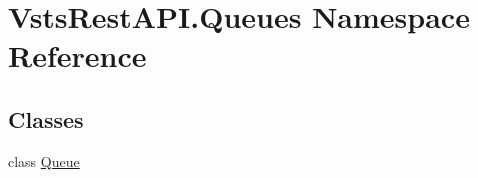 \hypertarget{namespace_vsts_rest_a_p_i_1_1_queues}{}\section{Vsts\+Rest\+A\+P\+I.\+Queues Namespace Reference}
\label{namespace_vsts_rest_a_p_i_1_1_queues}
\subsection*{Classes}
\begin{DoxyCompactItemize}
\item 
class \mbox{\hyperlink{class_vsts_rest_a_p_i_1_1_queues_1_1_queue}{Queue}}
\end{DoxyCompactItemize}
